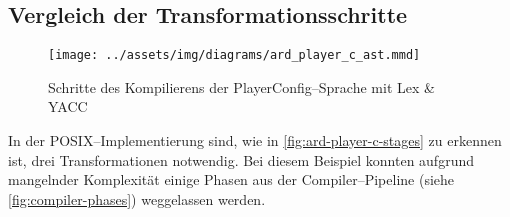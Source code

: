 \subsection{Vergleich der Transformationsschritte}\label{subsec:vergleich-der-transformationsschritte}
\begin{figure}[H]
    \begin{framed}
        
    \end{framed}
    \begin{framed}
        
    \end{framed}
    \begin{framed}
        \texttt{[image: ../assets/img/diagrams/ard\_player\_c\_ast.mmd]}
    \end{framed}
    \begin{framed}
        
    \end{framed}
    \caption{Schritte des Kompilierens der PlayerConfig--Sprache mit Lex \& \acs{YACC}}
    \label{fig:ard-player-c-stages}
\end{figure}
In der \acs{POSIX}--Implementierung sind, wie in \autoref{fig:ard-player-c-stages} zu erkennen ist, drei Transformationen notwendig.
Bei diesem Beispiel konnten aufgrund mangelnder Komplexität einige Phasen aus der Compiler--Pipeline (siehe \autoref{fig:compiler-phases}) weggelassen werden.

